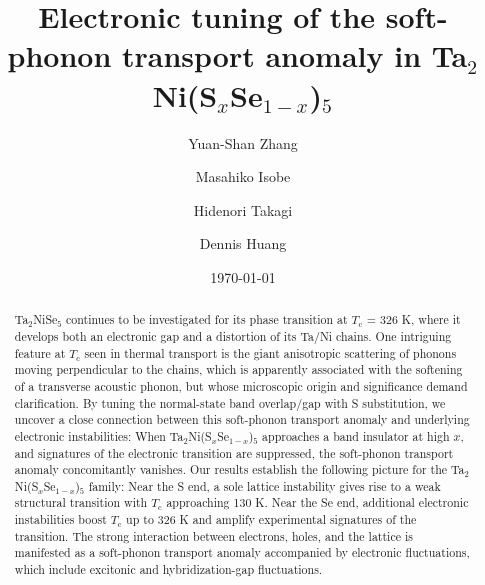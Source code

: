 \documentclass[aps,prl,twocolumn,superscriptaddress]{revtex4-2}
\begin{document}
\title{Electronic tuning of the soft-phonon transport anomaly in Ta$_2$Ni(S$_x$Se$_{1-x}$)$_5$}







\author{Yuan-Shan Zhang}
\author{Masahiko Isobe}
\author{Hidenori Takagi}
\author{Dennis Huang}


\date{\today}

\begin{abstract}
Ta$_2$NiSe$_5$ continues to be investigated for its phase transition at $T_\textrm{c}$ = 326 K, where it develops both an electronic gap and a distortion of its Ta/Ni chains. One intriguing feature at $T_\textrm{c}$ seen in thermal transport is the giant anisotropic scattering of phonons moving perpendicular to the chains, which is apparently associated with the softening of a transverse acoustic phonon, but whose microscopic origin and significance demand clarification. By tuning the normal-state band overlap/gap with S substitution, we uncover a close connection between this soft-phonon transport anomaly and underlying electronic instabilities: When Ta$_2$Ni(S$_x$Se$_{1-x}$)$_5$ approaches a band insulator at high $x$, and signatures of the electronic transition are suppressed, the soft-phonon transport anomaly concomitantly vanishes. Our results establish the following picture for the Ta$_2$Ni(S$_x$Se$_{1-x}$)$_5$ family: Near the S end, a sole lattice instability gives rise to a weak structural transition with $T_\textrm{c}$ approaching 130 K. Near the Se end, additional electronic instabilities boost $T_\textrm{c}$ up to 326 K and amplify experimental signatures of the transition. The strong interaction between electrons, holes, and the lattice is manifested as a soft-phonon transport anomaly accompanied by electronic fluctuations, which include excitonic and hybridization-gap fluctuations.
\end{abstract}
\end{document}
